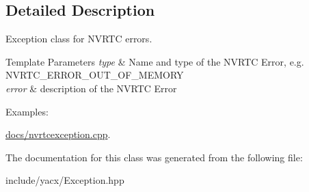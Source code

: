 \subsection{Detailed Description}
Exception class for N\+V\+R\+TC errors. 


\begin{DoxyTemplParams}{Template Parameters}
{\em type} & Name and type of the N\+V\+R\+TC Error, e.\+g. {\ttfamily N\+V\+R\+T\+C\+\_\+\+E\+R\+R\+O\+R\+\_\+\+O\+U\+T\+\_\+\+O\+F\+\_\+\+M\+E\+M\+O\+RY} \\
\hline
{\em error} & description of the N\+V\+R\+TC Error \\
\hline
\end{DoxyTemplParams}
\begin{Desc}
\item[Examples\+: ]\par
\hyperlink{docs_2nvrtcexception_8cpp-example}{docs/nvrtcexception.\+cpp}.\end{Desc}


The documentation for this class was generated from the following file\+:\begin{DoxyCompactItemize}
\item 
include/yacx/Exception.\+hpp\end{DoxyCompactItemize}
